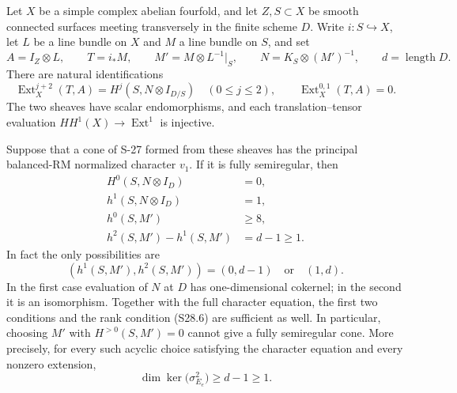 \begin{proposition}
\label{prop:semireg-surface-cone-cohomology}
Let $X$ be a simple complex abelian fourfold, and let
$Z,S\subset X$ be smooth connected surfaces meeting
transversely in the finite scheme $D$. Write $i:S\hookrightarrow X$,
let $L$ be a line bundle on $X$ and $M$ a line bundle on $S$,
and set
\[
 A=I_Z\otimes L,\qquad T=i_*M,\qquad
 M'=M\otimes L^{-1}|_S,\qquad
 N=K_S\otimes(M')^{-1},\qquad d=\operatorname{length}D.
\]
There are natural identifications
\[
 \operatorname{Ext}^{j+2}_X(T,A)=H^j(S,N\otimes I_{D/S})
       \quad(0\le j\le2),
 \qquad
 \operatorname{Ext}^{0,1}_X(T,A)=0.
 \tag{S29.1}
\]
The two sheaves have scalar endomorphisms, and each
translation--tensor evaluation $HH^1(X)\to\operatorname{Ext}^1$
is injective.

Suppose that a cone of S-27 formed from these sheaves has
the principal balanced-RM normalized character $v_1$.
If it is fully semiregular, then
\[
 \begin{split}
 H^0(S,N\otimes I_D)&=0,\\
 h^1(S,N\otimes I_D)&=1,\\
 h^0(S,M')&\ge8,\\
 h^2(S,M')-h^1(S,M')&=d-1\ge1.
 \end{split}
 \tag{S29.2}
\]
In fact the only possibilities are
\[
 (h^1(S,M'),h^2(S,M'))=(0,d-1)\quad\text{or}\quad(1,d).
 \tag{S29.2a}
\]
In the first case evaluation of $N$ at $D$ has
one-dimensional cokernel; in the second it is an
isomorphism. Together with the full character equation, the first two
conditions and the rank condition (S28.6) are sufficient
as well. In particular, choosing $M'$ with
$H^{>0}(S,M')=0$ cannot give a fully semiregular cone.
More precisely, for every such acyclic choice satisfying
the character equation and every nonzero extension,
\[
 \dim\ker\bigl(\sigma^2_{E_e}\bigr)\ge d-1\ge1.
 \tag{S29.3}
\]
\end{proposition}
